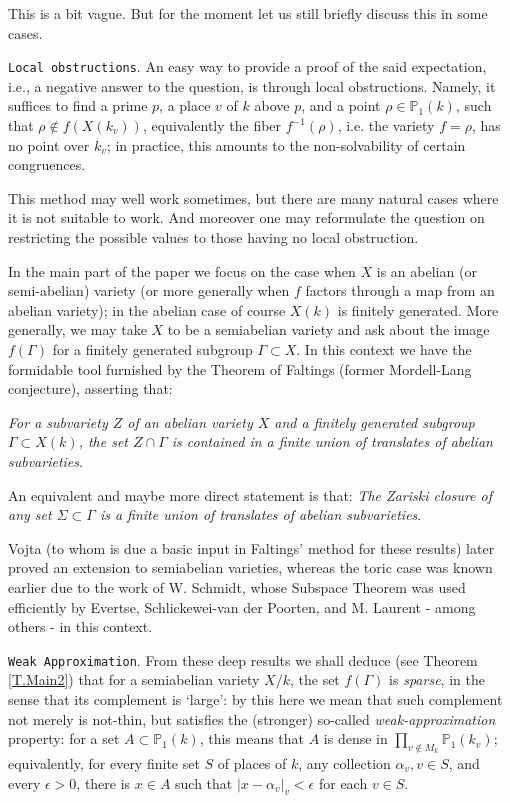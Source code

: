 \documentclass[leqno,12pt]{article} %
\def\P{{{\mathbb P}}}
\theoremstyle{plain} %
\theoremstyle{definition} %
\begin{document}
 This is a bit vague. But for the moment let us still  briefly discuss this in some cases.

\medskip

{\tt Local obstructions}. An easy way to provide a proof of the said expectation, i.e., a negative  answer to the question, is through local obstructions. Namely, it suffices to find a prime $p$, a place $v$ of $k$ above $p$,  and a point $\rho \in\P_1(k)$, such that $\rho\not\in f(X(k_v))$, equivalently the fiber $f^{-1}(\rho)$, i.e. the variety $f=\rho$, has no point over $k_v$; in practice, this amounts to the non-solvability of   certain congruences.

This method may well work sometimes, but there are many natural cases where it is not suitable  to work. And moreover one may   reformulate the question on restricting  the possible values to those having no local obstruction.  

\medskip


  In the main part of the paper we focus on the case when $X$ is an abelian (or semi-abelian) variety (or more generally when $f$ factors through a map from an abelian variety); in the abelian  case of course $X(k)$ is finitely generated. More generally, we may take $X$ to be a semiabelian variety and ask about the image $f(\Gamma)$ for a finitely generated subgroup $\Gamma\subset X$.  In this context we have the formidable  tool furnished by the Theorem of Faltings (former Mordell-Lang conjecture), asserting that: 

 {\it For a subvariety $Z$ of an  abelian variety $X$  and a finitely generated subgroup $\Gamma\subset X(k)$,  %
 the set $Z\cap\Gamma$ is contained in a finite union of translates of abelian subvarieties}. 
 
 An equivalent and maybe more direct statement is that:  {\it The Zariski closure of any  set $\Sigma\subset \Gamma$ is a finite union of translates of abelian subvarieties}.  
 
 Vojta (to whom is due a  basic input in Faltings' method for these results) later proved an extension to semiabelian varieties, whereas the toric case was known earlier due to the work of W. Schmidt, whose Subspace Theorem was used efficiently by Evertse, Schlickewei-van der Poorten, and M. Laurent - among others - in this context.

\medskip

{\tt Weak Approximation}.  From these deep  results we shall   deduce (see Theorem \ref{T.Main2}) that  for a semiabelian variety $X/k$, the set $f(\Gamma)$ is {\it sparse}, in the sense that its complement is `large': by this here we mean that such complement not merely is not-thin, but   satisfies the (stronger) so-called 
 {\it weak-approximation} property:  for a set $A\subset \P_1(k)$, this means that $A$ is dense in $\prod_{v\not\in M_k}\P_1(k_v)$; equivalently, for every finite set $S$ of places of $k$,  any collection $\alpha_v, v\in S$, and every $\epsilon >0$, there is $x\in A$ such that $|x-\alpha_v|_v<\epsilon$ for each $v\in S$. 
 
\end{document}
